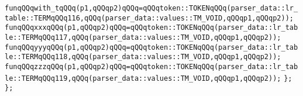 \verb|funqQQqwith_tqQQq(p1,qQQqp2)qQQq=qQQqtoken::TOKENqQQq(parser_data::lr_table::TERMqQQq116,qQQq(parser_data::values::TM_VOID,qQQqp1,qQQqp2));|\newline
\verb|funqQQqxxxqQQq(p1,qQQqp2)qQQq=qQQqtoken::TOKENqQQq(parser_data::lr_table::TERMqQQq117,qQQq(parser_data::values::TM_VOID,qQQqp1,qQQqp2));|\newline
\verb|funqQQqyyyqQQq(p1,qQQqp2)qQQq=qQQqtoken::TOKENqQQq(parser_data::lr_table::TERMqQQq118,qQQq(parser_data::values::TM_VOID,qQQqp1,qQQqp2));|\newline
\verb|funqQQqzzzqQQq(p1,qQQqp2)qQQq=qQQqtoken::TOKENqQQq(parser_data::lr_table::TERMqQQq119,qQQq(parser_data::values::TM_VOID,qQQqp1,qQQqp2));|\newline
\verb|};|\newline
\verb|};|\newline

